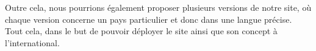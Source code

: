 \documentclass[a4paper,12pt]{book}
\theoremstyle{break}
\theoremstyle{break}
\theoremstyle{definition}
\theoremstyle{remark}
\begin{document}
   Outre cela, nous pourrions également proposer plusieurs versions de notre site, où chaque version concerne un pays particulier et donc dans une langue précise.
   Tout cela, dans le but de pouvoir déployer le site ainsi que son concept à l'international. 





\end{document}
